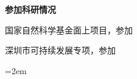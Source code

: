 \vspace*{1em}

%
%	


\textbf{参加科研情况}
\begin{publist}
	\item 国家自然科学基金面上项目，参加
	\item 深圳市可持续发展专项，参加
	
\end{publist}
\vfill
{}\hangindent=2em\noindent

\setlength{\parindent}{2em}

